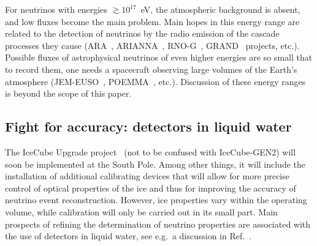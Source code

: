 \documentclass[a4paper,noshowpacs,noshowkeys,floatfix,twocolumn,preprintnumbers,nofootinbib]{revtex4-2}
\begin{document}
For neutrinos with energies $\gtrsim 10^{17}$~eV, the atmospheric background is absent, and low fluxes become the main problem. Main hopes in this energy range are related to the detection of neutrinos by the radio emission of the cascade processes they cause (ARA~\cite{ARA}, ARIANNA~\cite{ARIANNA}, RNO-G~\cite{RNO-G}, GRAND~\cite{GRAND} projects, etc.). Possible fluxes of astrophysical neutrinos of even higher energies are so small  that to record them, one needs a spacecraft observing large volumes of the Earth's atmosphere (JEM-EUSO~\cite{JEM-EUSO}, POEMMA~\cite{POEMMA}, etc.). Discussion of these energy ranges is beyond the scope of this paper.

\subsection{Fight for accuracy: detectors in liquid water}
\label{sec:prospects:water}
The IceCube Upgrade project~\cite{IceCube-upgrade} (not to be confused with IceCube-GEN2) will soon be implemented at the South Pole. Among other things, it will include the installation of additional calibrating devices that will allow for more precise control of optical properties of the ice and thus for improving the accuracy of neutrino event reconstruction. However, ice properties vary within the operating volume, while calibration will only be carried out in its small part. Main prospects of refining the determination of neutrino properties are associated with the use of detectors in liquid water, see e.g.\ a discussion in Ref.~\cite{ST-UFN}.
\end{document}
